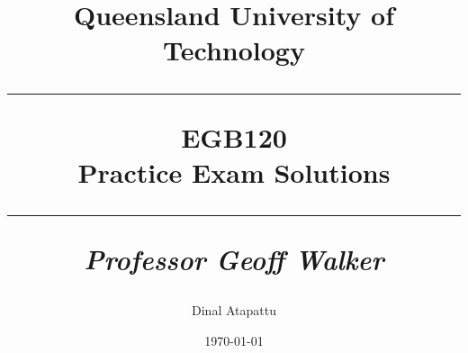 \documentclass[oneside]{book}
\begin{document}
\pagestyle{fancy}
    \fancyhf{}
\fancyhead[R]{\nouppercase{\leftmark}}
\renewcommand{\footrulewidth}{0.4pt}
    \title{
            Queensland University of Technology\\
            \rule{\linewidth}{0.5pt}
        \centering
        \textbf{EGB120} \\
        Practice Exam Solutions\\
        \vspace{0.4cm}
        \rule{\linewidth}{1.5pt}
        \small{\textit{Professor Geoff Walker}}
    }
    \author{Dinal Atapattu}
    \date{\today}
    \maketitle
    \thispagestyle{empty}
    \tableofcontents
    
    
    
\end{document}
